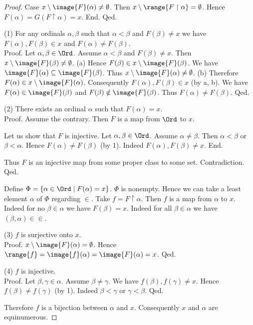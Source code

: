 \documentclass{stex}
\begin{document}
\begin{forthel}
\begin{proof}
        Case $x \setminus \image{F}(\alpha) \neq \emptyset$.
          Then $x \setminus \range{F \restriction \alpha} = \emptyset$.
          Hence $F(\alpha)
            = G(F \restriction \alpha)
            = x$.
        End.
      Qed.

      (1) For any ordinals $\alpha, \beta$ such that $\alpha \less \beta$ and
      $F(\beta) \neq x$ we have $F(\alpha), F(\beta) \in x$ and $F(\alpha) \neq
      F(\beta)$. \\
      Proof.
        Let $\alpha, \beta \in \Ord$.
        Assume $\alpha \less \beta$ and $F(\beta) \neq x$.
        Then $x \setminus \image{F}(\beta) \neq \emptyset$.
        (a) Hence $F(\beta) \in x \setminus \image{F}(\beta)$.
        We have $\image{F}(\alpha) \subseteq \image{F}(\beta)$.
        Thus $x \setminus \image{F}(\alpha) \neq \emptyset$.
        (b) Therefore $F(\alpha) \in x \setminus \image{F}(\alpha)$.
        Consequently $F(\alpha), F(\beta) \in x$ (by a, b).
        We have $F(\alpha) \in \image{F}(\beta)$ and $F(\beta) \notin \image{F}(\beta)$.
        Thus $F(\alpha) \neq F(\beta)$.
      Qed.

      (2) There exists an ordinal $\alpha$ such that $F(\alpha) = x$. \\
      Proof.
        Assume the contrary.
        Then $F$ is a map from $\Ord$ to $x$.

        Let us show that $F$ is injective.
          Let $\alpha, \beta \in \Ord$.
          Assume $\alpha \neq \beta$.
          Then $\alpha \less \beta$ or $\beta \less \alpha$.
          Hence $F(\alpha) \neq F(\beta)$ (by 1).
          Indeed $F(\alpha), F(\beta) \neq x$.
        End.

        Thus $F$ is an injective map from some proper class to some set.
        Contradiction.
      Qed.

      Define $\Phi = \{ \alpha \in \Ord \mid F(\alpha) = x \}$.
      $\Phi$ is nonempty.
      Hence we can take a least element $\alpha$ of $\Phi$ regarding ${\in}$.
      Take $f = F \restriction \alpha$.
      Then $f$ is a map from $\alpha$ to $x$.
      Indeed for no $\beta \in \alpha$ we have $F(\beta) = x$.
      Indeed for all $\beta \in \alpha$ we have $(\beta, \alpha) \in {\in}$.

      (3) $f$ is surjective onto $x$. \\
      Proof.
        $x \setminus \image{F}(\alpha) = \emptyset$.
        Hence $\range{f}
          = \image{f}(\alpha)
          = \image{F}(\alpha)
          = x$.
      Qed.

      (4) $f$ is injective. \\
      Proof.
        Let $\beta, \gamma \in \alpha$.
        Assume $\beta \neq \gamma$.
        We have $f(\beta), f(\gamma) \neq x$.
        Hence $f(\beta) \neq f(\gamma)$ (by 1).
        Indeed $\beta \less \gamma$ or $\gamma \less \beta$.
      Qed.

      Therefore $f$ is a bijection between $\alpha$ and $x$.
      Consequently $x$ and $\alpha$ are equinumerous.
    \end{proof}
  \end{forthel}

  \printbibliography
\end{document}
